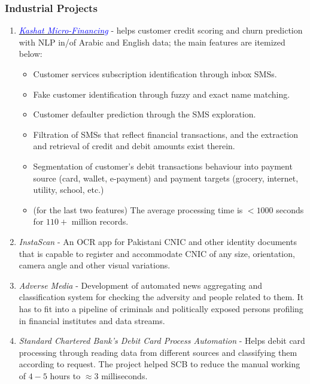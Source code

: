 \documentclass[a4paper, 10pt]{article}
\begin{document}
\subsubsection*{Industrial Projects}
\begin{enumerate}
\itemsep = 0em
\item \emph{ \href{https://kashat.com.eg/en/}{\textcolor{blue}{Kashat Micro-Financing}}} - helps {customer credit scoring} and {churn prediction} with NLP in/of {Arabic}
and {English} data; the main features are itemized below:
\begin{itemize}
\itemsep = 0em

\item Customer {services subscription identification} through inbox SMSs.

\item {Fake customer identification} through fuzzy and exact name matching.

\item {Customer defaulter prediction} through the SMS exploration.

\item Filtration of SMSs that reflect financial transactions, and the {extraction and retrieval of credit and debit amounts} exist therein.

\item Segmentation of {customer's debit transactions behaviour into payment source} (card, wallet, e-payment) and {payment targets} (grocery, internet, utility, school, etc.)

\item (for the last two features) The average processing time is $<\!1000$ seconds for $110+$ million records.
\end{itemize}

\item \emph{ InstaScan} - An OCR app for Pakistani CNIC and other identity documents that is capable to register and accommodate CNIC of any size, orientation, camera angle and other visual variations.

\item \emph{ Adverse Media} - Development of automated news aggregating and classification system for checking the adversity and people related to them. It has to fit into a pipeline of criminals and politically exposed persons profiling in financial institutes and data streams.

\item \emph{ Standard Chartered Bank's Debit Card Process Automation} - Helps debit card processing through reading data from different sources and classifying them according to request. The project helped SCB to reduce the manual working of $4\!-\!5$ hours to $\approx\!3$ milliseconds.


\end{enumerate}
\end{document}
